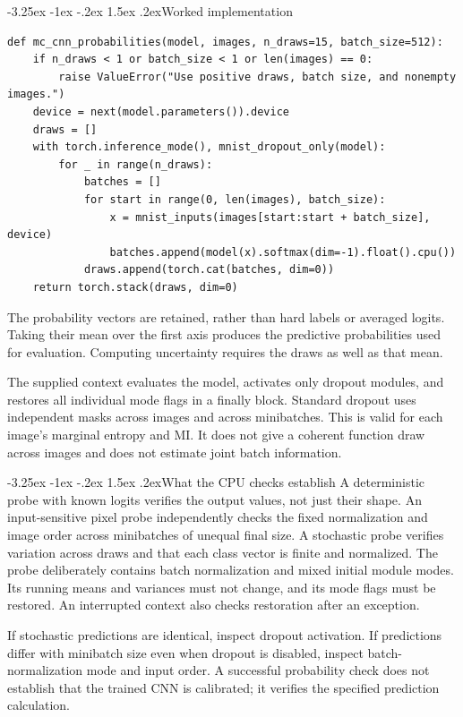 \documentclass[11pt,a4paper]{article}
\makeatletter
\renewcommand\subsection{\@startsection{subsection}{2}{\z@}%
  {-3.25ex \@plus -1ex \@minus -.2ex}%
  {1.5ex \@plus .2ex}{\normalfont\large}}
\makeatother
\begin{document}
\subsection{Worked implementation}
\begin{lstlisting}
def mc_cnn_probabilities(model, images, n_draws=15, batch_size=512):
    if n_draws < 1 or batch_size < 1 or len(images) == 0:
        raise ValueError("Use positive draws, batch size, and nonempty images.")
    device = next(model.parameters()).device
    draws = []
    with torch.inference_mode(), mnist_dropout_only(model):
        for _ in range(n_draws):
            batches = []
            for start in range(0, len(images), batch_size):
                x = mnist_inputs(images[start:start + batch_size], device)
                batches.append(model(x).softmax(dim=-1).float().cpu())
            draws.append(torch.cat(batches, dim=0))
    return torch.stack(draws, dim=0)
\end{lstlisting}
The probability vectors are retained, rather than hard labels or averaged
logits. Taking their mean over the first axis produces the predictive
probabilities used for evaluation. Computing uncertainty requires the draws
as well as that mean.

The supplied context evaluates the model, activates only dropout modules,
and restores all individual mode flags in a finally block. Standard dropout
uses independent masks across images and across minibatches. This is valid
for each image's marginal entropy and MI. It does not give a coherent function
draw across images and does not estimate joint batch information.

\subsection{What the CPU checks establish}
A deterministic probe with known logits verifies the output values, not just
their shape. An input-sensitive pixel probe independently checks the fixed
normalization and image order across minibatches of unequal final size.
A stochastic probe verifies variation across draws and that each
class vector is finite and normalized. The probe deliberately contains batch
normalization and mixed initial module modes. Its running means and variances
must not change, and its mode flags must be restored. An interrupted
context also checks restoration after an exception.

If stochastic predictions are identical, inspect dropout activation. If
predictions differ with minibatch size even when dropout is disabled, inspect
batch-normalization mode and input order. A successful probability check does
not establish that the trained CNN is calibrated; it verifies the specified
prediction calculation.
\end{document}
